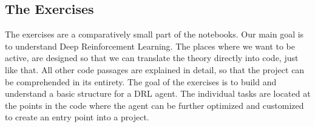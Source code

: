 \subsection{The Exercises}
	The exercises are a comparatively small part of the notebooks. Our main goal is to understand Deep Reinforcement Learning. The places where we want to be active, are designed so that we can translate the theory directly into code, just like that. All other code passages are explained in detail, so that the project can be comprehended in its entirety. The goal of the exercises is to build and understand a basic structure for a DRL agent. The individual tasks are located at the points in the code where the agent can be further optimized and customized to create an entry point into a project.
	   
	
